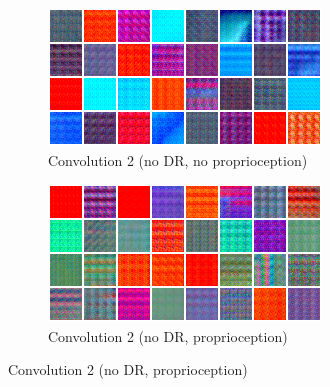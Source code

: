 \begin{figure}
  \begin{subfigure}{0.49\textwidth}
    \includegraphics[width=\textwidth]{figures/chapter6/act_max/jaco_nodr_noprop_conv2}
    \caption{Convolution 2 (no DR, no proprioception)}
  \end{subfigure}
  \begin{subfigure}{0.49\textwidth}
    \includegraphics[width=\textwidth]{figures/chapter6/act_max/jaco_nodr_prop_conv2}
    \caption{Convolution 2 (no DR, proprioception)}
  \end{subfigure}


\end{figure}
